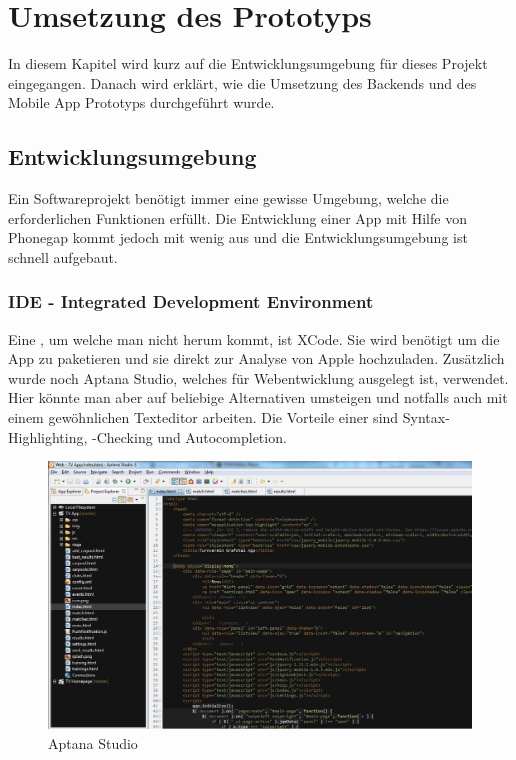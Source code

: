 %
%

\chapter{Umsetzung des Prototyps}\label{chap.umsetzung}
In diesem Kapitel wird kurz auf die Entwicklungsumgebung für dieses Projekt eingegangen. Danach wird erklärt, wie die Umsetzung des Backends und des Mobile App Prototyps durchgeführt wurde.

\section{Entwicklungsumgebung}\label{entwicklungsumgebung}
Ein Softwareprojekt benötigt immer eine gewisse Umgebung, welche die erforderlichen Funktionen erfüllt. Die Entwicklung einer App mit Hilfe von Phonegap kommt jedoch mit wenig aus und die Entwicklungsumgebung ist schnell aufgebaut.

\subsection{IDE - Integrated Development Environment}
Eine , um welche man nicht herum kommt, ist XCode. Sie wird benötigt um die App zu paketieren und sie direkt zur Analyse von Apple hochzuladen. Zusätzlich wurde noch Aptana Studio, welches für Webentwicklung ausgelegt ist, verwendet. Hier könnte man aber auf beliebige Alternativen umsteigen und notfalls auch mit einem gewöhnlichen Texteditor arbeiten. Die Vorteile einer  sind Syntax-Highlighting, -Checking und Autocompletion.

\begin{figure}[h]
\centering
\includegraphics[scale=0.5]{images/aptana.png}
\caption{Aptana Studio}
\label{fig:aptana}
\end{figure}


